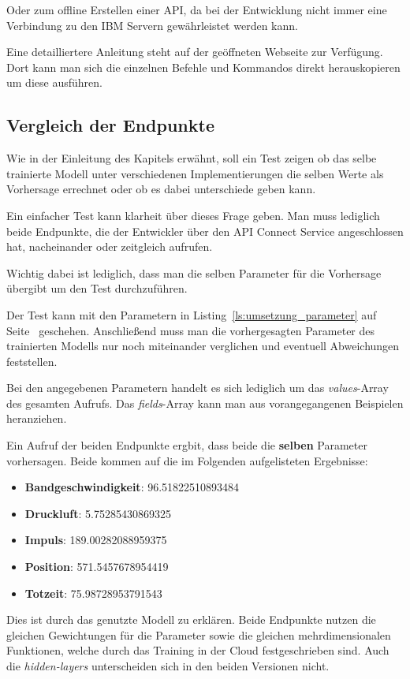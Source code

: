 Oder zum offline Erstellen einer API, da bei der Entwicklung nicht immer eine Verbindung zu den IBM Servern
gewährleistet werden kann.

Eine detailliertere Anleitung steht auf der geöffneten Webseite zur Verfügung. Dort kann man sich die einzelnen Befehle
und Kommandos direkt herauskopieren um diese ausführen.

\subsection{Vergleich der Endpunkte}
Wie in der Einleitung des Kapitels erwähnt, soll ein Test zeigen ob das selbe trainierte Modell unter verschiedenen
Implementierungen die selben Werte als Vorhersage errechnet oder ob es dabei unterschiede geben kann.

Ein einfacher Test kann klarheit über dieses Frage geben. Man muss lediglich beide Endpunkte, die der Entwickler über
den API Connect Service angeschlossen hat, nacheinander oder zeitgleich aufrufen.

Wichtig dabei ist lediglich, dass man die selben Parameter für die Vorhersage übergibt um den Test durchzuführen.

Der Test kann mit den Parametern in Listing~\ref{ls:umsetzung_parameter} auf Seite~\pageref{ls:umsetzung_parameter} 
geschehen. Anschließend muss man die vorhergesagten Parameter des trainierten Modells nur noch miteinander verglichen
und eventuell Abweichungen feststellen.

Bei den angegebenen Parametern handelt es sich lediglich um das \textit{values}-Array des gesamten Aufrufs. Das 
\textit{fields}-Array kann man aus vorangegangenen Beispielen heranziehen.

Ein Aufruf der beiden Endpunkte ergbit, dass beide die \textbf{selben} Parameter vorhersagen. Beide kommen auf die
im Folgenden aufgelisteten Ergebnisse:

\begin{itemize}
    \item \textbf{Bandgeschwindigkeit}: 96.51822510893484
    \item \textbf{Druckluft}: 5.75285430869325
    \item \textbf{Impuls}: 189.00282088959375
    \item \textbf{Position}: 571.5457678954419
    \item \textbf{Totzeit}: 75.98728953791543
\end{itemize}

Dies ist durch das genutzte Modell zu erklären. Beide Endpunkte nutzen die gleichen Gewichtungen für die Parameter sowie
die gleichen mehrdimensionalen Funktionen, welche durch das Training in der Cloud festgeschrieben sind. Auch die
\textit{hidden-layers} unterscheiden sich in den beiden Versionen nicht.

